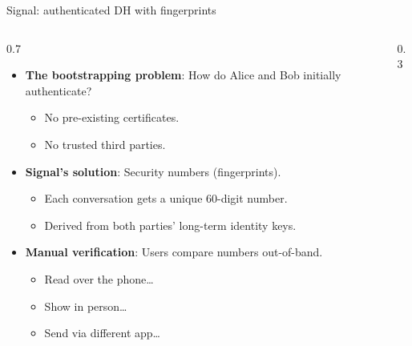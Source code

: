 \ifdefined\PRESENTATION\else\PassOptionsToClass{handout}{beamer}\fi\documentclass[aspectratio=169, lualatex]{beamer}
\begin{document}
\begin{frame}{Signal: authenticated DH with fingerprints}
	\begin{columns}[c]
		\begin{column}{0.7\textwidth}
			\begin{itemize}[<+->]
				\item \textbf{The bootstrapping problem}: How do Alice and Bob initially authenticate?
				      \begin{itemize}
					      \item No pre-existing certificates.
					      \item No trusted third parties.
				      \end{itemize}
				\item \textbf{Signal's solution}: Security numbers (fingerprints).
				      \begin{itemize}
					      \item Each conversation gets a unique 60-digit number.
					      \item Derived from both parties' long-term identity keys.
				      \end{itemize}
				\item \textbf{Manual verification}: Users compare numbers out-of-band.
				      \begin{itemize}
					      \item Read over the phone\ldots
					      \item Show in person\ldots
					      \item Send via different app\ldots
				      \end{itemize}
			\end{itemize}
		\end{column}
		\begin{column}{0.3\textwidth}
		\end{column}
	\end{columns}
\end{frame}
\end{document}
